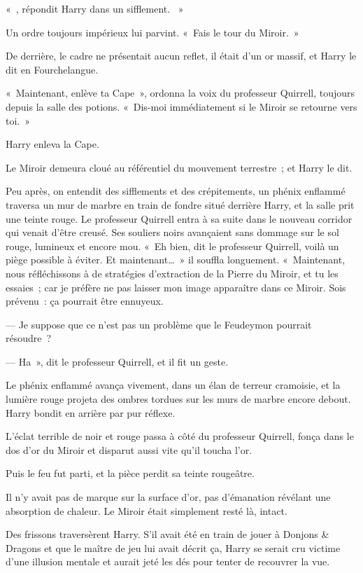 «~, répondit Harry dans un sifflement.
~»

Un ordre toujours impérieux lui parvint.
«~Fais le tour du Miroir.~»

De derrière, le cadre ne présentait aucun reflet, il était d'un or massif, et Harry le dit en Fourchelangue.

«~Maintenant, enlève ta Cape~», ordonna la voix du professeur Quirrell, toujours depuis la salle des potions.
«~Dis-moi immédiatement si le Miroir se retourne vers toi.~»

Harry enleva la Cape.

Le Miroir demeura cloué au référentiel du mouvement terrestre~; et Harry le dit.

Peu après, on entendit des sifflements et des crépitements, un phénix enflammé traversa un mur de marbre en train de fondre situé derrière Harry, et la salle prit une teinte rouge.
Le professeur Quirrell entra à sa suite dans le nouveau corridor qui venait d'être creusé.
Ses souliers noirs avançaient sans dommage sur le sol rouge, lumineux et encore mou.
«~Eh bien, dit le professeur Quirrell, voilà un piège possible à éviter.
Et maintenant…~»
il souffla longuement.
«~Maintenant, nous réfléchissons à de stratégies d'extraction de la Pierre du Miroir, et tu les essaies~; car je préfère ne pas laisser mon image apparaître dans ce Miroir.
Sois prévenu~: ça pourrait être ennuyeux.

--- Je suppose que ce n'est pas un problème que le Feudeymon pourrait résoudre~?

--- Ha~», dit le professeur Quirrell, et il fit un geste.

Le phénix enflammé avança vivement, dans un élan de terreur cramoisie, et la lumière rouge projeta des ombres tordues sur les murs de marbre encore debout.
Harry bondit en arrière par pur réflexe.

L'éclat terrible de noir et rouge passa à côté du professeur Quirrell, fonça dans le dos d'or du Miroir et disparut aussi vite qu'il toucha l'or.

Puis le feu fut parti, et la pièce perdit sa teinte rougeâtre.

Il n'y avait pas de marque sur la surface d'or, pas d'émanation révélant une absorption de chaleur.
Le Miroir était simplement resté là, intact.

Des frissons traversèrent Harry.
S'il avait été en train de jouer à Donjons \& Dragons et que le maître de jeu lui avait décrit ça, Harry se serait cru victime d'une illusion mentale et aurait jeté les dés pour tenter de recouvrer la vue.

